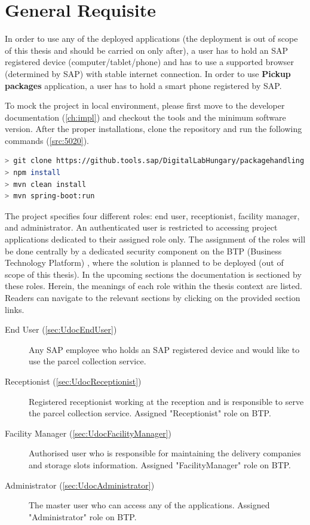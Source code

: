 \section{General Requisite}
\label{sec:GeneralRequisite}
In order to use any of the deployed applications (the deployment is out of scope of this thesis and should be carried on only after), a user has to hold an SAP registered device (computer/tablet/phone) and has to use a supported browser (determined by SAP) with stable internet connection. In order to use \textbf{Pickup packages} application, a user has to hold a smart phone registered by SAP. 

To mock the project in local environment, please first move to the developer documentation (\autoref{ch:impl}) and checkout the tools and the minimum software version. After the proper installations, clone the repository and run the following commands (\autoref{src:5020}).

\begin{lstlisting}[language={bash}]
> git clone https://github.tools.sap/DigitalLabHungary/packagehandling.git
> npm install
> mvn clean install
> mvn spring-boot:run
\end{lstlisting}

The project specifies four different roles: end user, receptionist, facility manager, and administrator. An authenticated user is restricted to accessing project applications dedicated to their assigned role only. The assignment of the roles will be done centrally by a dedicated security component on the BTP (Business Technology Platform) \cite{btp}, where the solution is planned to be deployed (out of scope of this thesis). In the upcoming sections the documentation is sectioned by these roles. Herein, the meanings of each role within the thesis context are listed. Readers can navigate to the relevant sections by clicking on the provided section links.

\begin{description}
	\item[End User (\autoref{sec:UdocEndUser})] Any SAP employee who holds an SAP registered device and would like to use the parcel collection service.
	\item[Receptionist (\autoref{sec:UdocReceptionist})] Registered receptionist working at the reception and is responsible to serve the parcel collection service. Assigned "Receptionist" role on BTP.
	\item[Facility Manager (\autoref{sec:UdocFacilityManager})] Authorised user who is responsible for maintaining the delivery companies and storage slots information. Assigned "FacilityManager" role on BTP.
	\item[Administrator (\autoref{sec:UdocAdministrator})] The master user who can access any of the applications. Assigned "Administrator" role on BTP.
\end{description}

